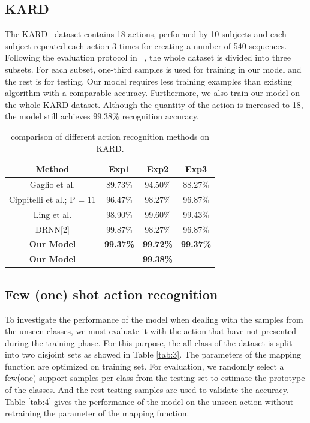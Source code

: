 \documentclass{bmvc2k}
\begin{document}
\subsection*{KARD}
The KARD~\cite{gaglio2015human} dataset contains 18 actions, performed by 10 subjects and each subject repeated each action 3 times for creating a number of 540 sequences. Following the evaluation protocol in ~\cite{pham2017learning}, the whole dataset is divided into three subsets. For each subset, one-third samples is used for training in our model and the rest is for testing. Our model requires less training examples than existing algorithm with a comparable accuracy. Furthermore, we also train our model on the whole KARD dataset. Although the quantity of the action is increased to 18, the model still achieves $99.38\%$ recognition accuracy.

\begin{table}[htb]
	\begin{center}
		\scalebox{1.1}
		{
			\begin{tabular}{|c|c|c|c|}
				\hline
				Method & Exp1 & Exp2 & Exp3 \\
				\hline\hline
				Gaglio et al. & 89.73\% & 94.50\%&88.27\%\\
				Cippitelli et al.; P = 11 & 96.47\% & 98.27\% & 96.87\%\\
				Ling et al. & 98.90\% & 99.60\% & 99.43\%\\
				DRNN[2] & 99.87\% & 98.27\% & 96.87\%\\
				\textbf{Our Model} & \textbf{99.37\%} & \textbf{99.72\%} & \textbf{99.37\%} \\
				\hline
				\textbf{Our Model} &  \multicolumn{3}{|c|}{\textbf{99.38\%}}\\
				\hline
			\end{tabular}
		}
	\end{center}
	\caption{ comparison of different action recognition methods on KARD. }
	\label{tab:2}
\end{table}

\subsection*{Few (one) shot action recognition}
To investigate the performance of the model when dealing with the samples from the unseen classes, we must evaluate it with the action that have not presented during the training phase. For this purpose, the all class of the dataset is split into two disjoint sets as showed in Table \ref{tab:3}. The parameters of the mapping function are optimized on training set. For evaluation, we randomly select a few(one) support samples per class from the testing set to estimate the prototype of the classes. And the rest testing samples are used to validate the accuracy. Table \ref{tab:4} gives the performance of the model on the unseen action without retraining the parameter of the mapping function. 
\end{document}
